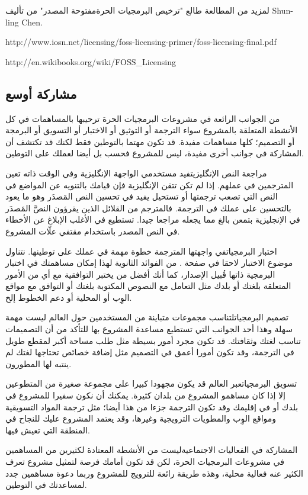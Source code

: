 لمزيد من المطالعة طالع "ترخيص البرمجيات الحرة مفتوحة
المصدر" من تأليف Shun-ling Chen.

http://www.iosn.net/licensing/foss-licensing-primer/foss-licensing-final.pdf

http://en.wikibooks.org/wiki/FOSS\_Licensing

\subsection{مشاركة أوسع}
من الجوانب الرائعة في مشروعات البرمجيات الحرة ترحيبها بالمساهمات في كل
الأنشطة المتعلقة بالمشروع سواء الترجمة أو التوثيق أو الاختبار أو
التسويق أو البرمجة أو التصميم؛ كلها مساهمات مفيدة. قد تكون مهتما
بالتوطين فقط لكنك قد تكتشف أن المشاركة في جوانب أخرى مفيدة، ليس للمشروع
فحسب بل أيضا لعملك على التوطين.

مراجعة النص الإنگليزي{\md  تفيد مستخدمي الواجهة الإنگليزية وفي الوقت
ذاته تعين المترجمين في عملهم. إذا لم تكن تتقن الإنگليزية فإن قيامك
بالتنويه عن المواضع في النص التي تصعب ترجمتها أو تستحيل يفيد في تحسين
النص المَصدَر وهو ما يعود بالتحسين على عملك في الترجمة. فالمترجم من
القلائل الذين يقرؤون النصَّ المَصدَر في الإنجليزية بتمعن بالغ مما يجعله
مراجعا جيدا. تستطيع في الأغلب الإبلاغ عن الأخطاء في النص المصدر
باستخدام مقتفي علّات المشروع.}

اختبار البرمجيات{\md  في واجهتها المترجمة خطوة مهمة في عملك على توطينها.
نتناول موضوع الاختبار لاحقا في صفحة }{\md
\at[ref:34441726]}{\md . من الفوائد الثانوية لهذا إمكان
مساهمتك في اختبار البرمجية ذاتها قُبيل الإصدار، كما أنك أفضل من يختبر
التوافقية مع أي من الأمور المتعلقة بلغتك أو بلدك مثل التعامل مع النصوص
المكتوبة بلغتك أو التوافق مع مواقع الوِب أو المحلية أو دعم الخطوط إلخ.}

تصميم البرمجيات{\md  لتناسب مجموعات متباينة من المستخدمين حول العالم
ليست مهمة سهلة وهذا أحد الجوانب التي تستطيع مساعدة المشروع بها للتأكد
من أن التصميمات تناسب لغتك وثقافتك. قد تكون مجرد أمور بسيطة مثل طلب
مساحة أكبر لمقطع طويل في الترجمة، وقد تكون أمورا أعمق في التصميم مثل
إضافة خصائص تحتاجها لغتك لم ينتبه لها المطورون.}

تسويق البرمجيات{\md  عبر العالم قد يكون مجهودا كبيرا على مجموعة صغيرة من
المتطوعين إلا إذا كان مساهمو المشروع من بلدان كثيرة. يمكنك أن نكون
سفيرا للمشروع في بلدك أو في إقليمك وقد تكون الترجمة جزءا من هذا أيضا؛
مثل ترجمة المواد التسويقية ومواقع الوِب والمطويات }{\md الترويجية
وغيرها، وقد يعتمد المشروع عليك للنجاح في المنطقة التي تعيش فيها.}

المشاركة في الفعاليات الاجتماعية{\md  ليست من الأنشطة المعتادة لكثيرين
من المساهمين في مشروعات البرمجيات الحرة، لكن قد تكون أمامك فرصة لتمثيل
مشروع تعرف الكثير عنه فعالية محلية، وهذه طريقة رائعة للترويج للمشروع
وربما دعوة مساهمين جدد لمساعدتك في التوطين.}

